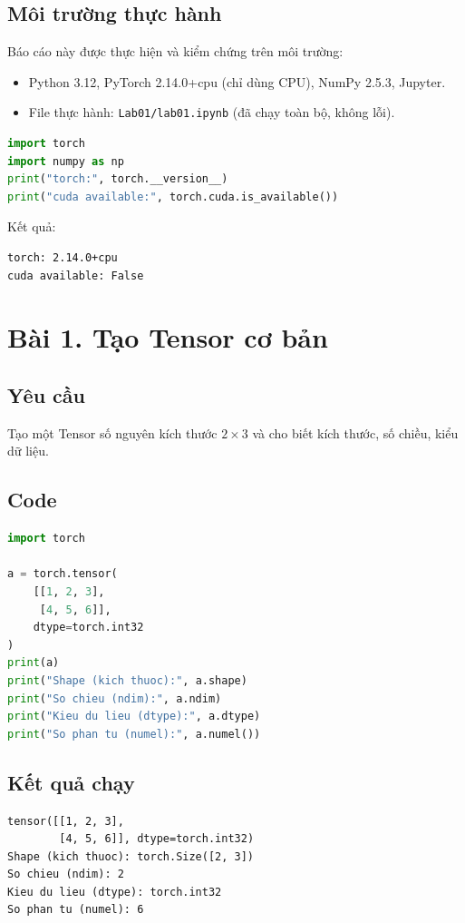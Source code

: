 \documentclass[a4paper,13pt]{article}
\begin{document}
\subsection{Môi trường thực hành}
Báo cáo này được thực hiện và kiểm chứng trên môi trường:
\begin{itemize}
  \item Python 3.12, PyTorch 2.14.0+cpu (chỉ dùng CPU), NumPy 2.5.3, Jupyter.
  \item File thực hành: \texttt{Lab01/lab01.ipynb} (đã chạy toàn bộ, không lỗi).
\end{itemize}
\begin{lstlisting}[language=Python]
import torch
import numpy as np
print("torch:", torch.__version__)
print("cuda available:", torch.cuda.is_available())
\end{lstlisting}
Kết quả:
\begin{lstlisting}[backgroundcolor=\color{outgray}]
torch: 2.14.0+cpu
cuda available: False
\end{lstlisting}

\newpage
\section{Bài 1. Tạo Tensor cơ bản}

\subsection{Yêu cầu}
Tạo một Tensor số nguyên kích thước $2 \times 3$ và cho biết kích thước, số chiều, kiểu dữ liệu.

\subsection{Code}
\begin{lstlisting}[language=Python]
import torch

a = torch.tensor(
    [[1, 2, 3],
     [4, 5, 6]],
    dtype=torch.int32
)
print(a)
print("Shape (kich thuoc):", a.shape)
print("So chieu (ndim):", a.ndim)
print("Kieu du lieu (dtype):", a.dtype)
print("So phan tu (numel):", a.numel())
\end{lstlisting}

\subsection{Kết quả chạy}
\begin{lstlisting}[backgroundcolor=\color{outgray}]
tensor([[1, 2, 3],
        [4, 5, 6]], dtype=torch.int32)
Shape (kich thuoc): torch.Size([2, 3])
So chieu (ndim): 2
Kieu du lieu (dtype): torch.int32
So phan tu (numel): 6
\end{lstlisting}
\end{document}
